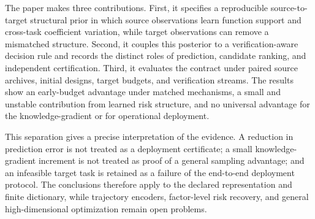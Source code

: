 The paper makes three contributions.  First, it specifies a reproducible
source-to-target structural prior in which source observations learn function
support and cross-task coefficient variation, while target observations can
remove a mismatched structure.  Second, it couples this posterior to a
verification-aware decision rule and records the distinct roles of prediction,
candidate ranking, and independent certification.  Third, it evaluates the
contract under paired source archives, initial designs, target budgets, and
verification streams.  The results show an early-budget advantage under
matched mechanisms, a small and unstable contribution from learned risk
structure, and no universal advantage for the knowledge-gradient or for
operational deployment.

This separation gives a precise interpretation of the evidence.  A reduction
in prediction error is not treated as a deployment certificate; a small
knowledge-gradient increment is not treated as proof of a general sampling
advantage; and an infeasible target task is retained as a failure of the
end-to-end deployment protocol.  The conclusions therefore apply to the
declared representation and finite dictionary, while trajectory encoders,
factor-level risk recovery, and general high-dimensional optimization remain
open problems.
